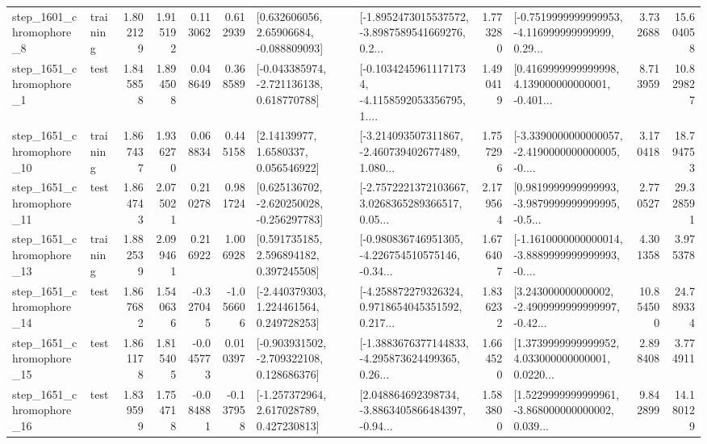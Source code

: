\begin{tabular}{llrrrrllrlrr}
  step\_1601\_chromophore\_8 &  training &      1.802129 &    1.915192 &      0.113062 &  0.612939 &     [0.632606056, 2.65906684, -0.088809093] &  [-1.8952473015537572, -3.8987589541669276, 0.2... &       1.773280 &  [-0.7519999999999953, -4.116999999999999, 0.29... &            3.732688 &         15.604058 \\
  step\_1651\_chromophore\_1 &      test &      1.845858 &    1.894508 &      0.048649 &  0.368589 &   [-0.043385974, -2.721136138, 0.618770788] &  [-0.10342459611171734, -4.1158592053356795, 1.... &       1.490419 &  [0.4169999999999998, 4.139000000000001, -0.401... &            8.713959 &         10.829827 \\
 step\_1651\_chromophore\_10 &  training &      1.867437 &    1.936270 &      0.068834 &  0.445158 &        [2.14139977, 1.6580337, 0.056546922] &  [-3.214093507311867, -2.460739402677489, 1.080... &       1.757296 &  [-3.3390000000000057, -2.4190000000000005, -0.... &            3.170418 &         18.794753 \\
 step\_1651\_chromophore\_11 &      test &      1.864743 &    2.075021 &      0.210278 &  0.981724 &   [0.625136702, -2.620250028, -0.256297783] &  [-2.7572221372103667, 3.0268365289366517, 0.05... &       2.179564 &  [0.9819999999999993, -3.9879999999999995, -0.5... &            2.770527 &         29.328591 \\
 step\_1651\_chromophore\_13 &  training &      1.882539 &    2.099461 &      0.216922 &  1.006928 &     [0.591735185, 2.596894182, 0.397245508] &  [-0.980836746951305, -4.226754510575146, -0.34... &       1.676407 &  [-1.1610000000000014, -3.8889999999999993, -0.... &            4.301358 &          3.975378 \\
 step\_1651\_chromophore\_14 &      test &      1.867682 &    1.540636 &     -0.327045 & -1.056606 &    [-2.440379303, 1.224461564, 0.249728253] &  [-4.258872279326324, 0.9718654045351592, 0.217... &       1.836232 &  [3.243000000000002, -2.4909999999999997, -0.42... &           10.854500 &         24.789334 \\
 step\_1651\_chromophore\_15 &      test &      1.861178 &    1.815405 &     -0.045773 &  0.010397 &   [-0.903931502, -2.709322108, 0.128686376] &  [-1.3883676377144833, -4.295873624499365, 0.26... &       1.664520 &  [1.3739999999999952, 4.033000000000001, 0.0220... &            2.898408 &          3.774911 \\
 step\_1651\_chromophore\_16 &      test &      1.839599 &    1.754718 &     -0.084881 & -0.137958 &    [-1.257372964, 2.617028789, 0.427230813] &  [2.048864692398734, -3.8863405866484397, -0.94... &       1.583800 &  [1.5229999999999961, -3.868000000000002, 0.039... &            9.842899 &         14.180129 \\

\end{tabular}
